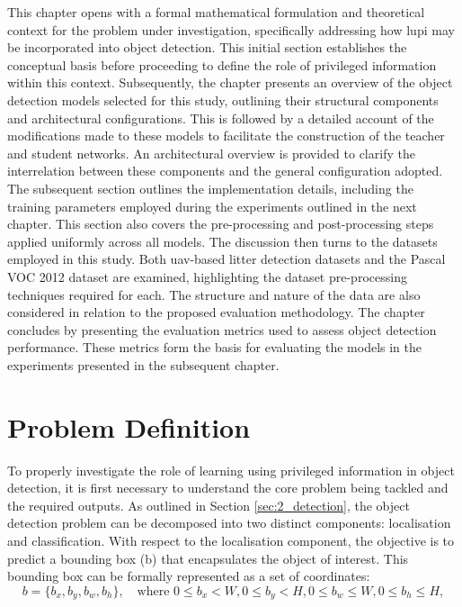 This chapter opens with a formal mathematical formulation and theoretical context for the problem under investigation, specifically addressing how \gls{lupi} may be incorporated into object detection. This initial section establishes the conceptual basis before proceeding to define the role of privileged information within this context.
Subsequently, the chapter presents an overview of the object detection models selected for this study, outlining their structural components and architectural configurations. This is followed by a detailed account of the modifications made to these models to facilitate the construction of the teacher and student networks. An architectural overview is provided to clarify the interrelation between these components and the general configuration adopted.
The subsequent section outlines the implementation details, including the training parameters employed during the experiments outlined in the next chapter. This section also covers the pre-processing and post-processing steps applied uniformly across all models.
The discussion then turns to the datasets employed in this study. Both \gls{uav}-based litter detection datasets and the Pascal VOC 2012 dataset are examined, highlighting the dataset pre-processing techniques required for each. The structure and nature of the data are also considered in relation to the proposed evaluation methodology.
The chapter concludes by presenting the evaluation metrics used to assess object detection performance. These metrics form the basis for evaluating the models in the experiments presented in the subsequent chapter.

\section{Problem Definition}
\label{sec:4_problem_definition}

To properly investigate the role of learning using privileged information in object detection, it is first necessary to understand the core problem being tackled and the required outputs. As outlined in Section \ref{sec:2_detection}, the object detection problem can be decomposed into two distinct components: localisation and classification.
With respect to the localisation component, the objective is to predict a bounding box (\gls{b}) that encapsulates the object of interest. This bounding box can be formally represented as a set of coordinates:
\begin{equation}
\label{eq:bounding_box}
b = \{b_x, b_y, b_w, b_h\}, \quad \text{where } 0 \leq b_x < W, 0 \leq b_y < H, 0 \leq b_w \leq W, 0 \leq b_h \leq H,
\end{equation}

